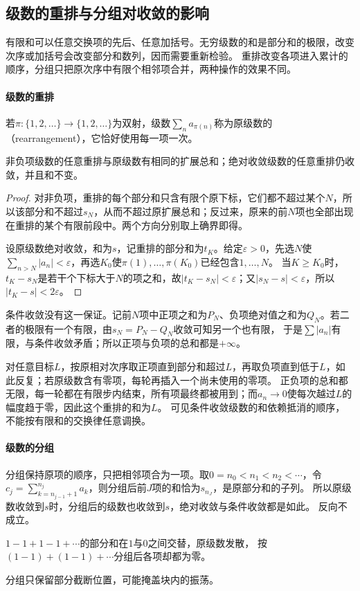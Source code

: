 \subsection{级数的重排与分组对收敛的影响}
\label{sec:ru-series-rearrangement-grouping}
\label{sec:analysis-series-rearrangement-grouping}

有限和可以任意交换项的先后、任意加括号。无穷级数的和是部分和的极限，改变次序或加括号会改变部分和数列，因而需要重新检验。
重排改变各项进入累计的顺序，分组只把原次序中有限个相邻项合并，两种操作的效果不同。

\paragraph{级数的重排}
若$\pi:\{1,2,\ldots\}\to\{1,2,\ldots\}$为双射，级数$\sum_na_{\pi(n)}$称为原级数的（rearrangement），它恰好使用每一项一次。
\begin{theorem}[保持和的重排]
\label{thm:ru-rearrangement}
非负项级数的任意重排与原级数有相同的扩展总和；绝对收敛级数的任意重排仍收敛，并且和不变。
\end{theorem}
\begin{proof}
对非负项，重排的每个部分和只含有限个原下标，它们都不超过某个$N$，所以该部分和不超过$s_N$，从而不超过原扩展总和；反过来，原来的前$N$项也全部出现在重排的某个有限前段中。两个方向分别取上确界即得。

设原级数绝对收敛，和为$s$，记重排的部分和为$t_K$。给定$\varepsilon>0$，先选$N$使$\sum_{n>N}|a_n|<\varepsilon$，再选$K_0$使$\pi(1),\ldots,\pi(K_0)$已经包含$1,\ldots,N$。
当$K\geq K_0$时，$t_K-s_N$是若干个下标大于$N$的项之和，故$|t_K-s_N|<\varepsilon$；又$|s_N-s|<\varepsilon$，所以$|t_K-s|<2\varepsilon$。
\end{proof}

条件收敛没有这一保证。记前$N$项中正项之和为$P_N$、负项绝对值之和为$Q_N$。若二者的极限有一个有限，由$s_N=P_N-Q_N$收敛可知另一个也有限，
于是$\sum|a_n|$有限，与条件收敛矛盾；所以正项与负项的总和都是$+\infty$。

对任意目标$L$，按原相对次序取正项直到部分和超过$L$，再取负项直到低于$L$，如此反复；若原级数含有零项，每轮再插入一个尚未使用的零项。
正负项的总和都无限，每一轮都在有限步内结束，所有项最终都被用到；而$a_n\to0$使每次越过$L$的幅度趋于零，因此这个重排的和为$L$。
可见条件收敛级数的和依赖抵消的顺序，不能按有限和的交换律任意调换。

\paragraph{级数的分组}
分组保持原项的顺序，只把相邻项合为一项。取$0=n_0<n_1<n_2<\cdots$，令$c_j=\sum_{k=n_{j-1}+1}^{n_j}a_k$，则分组后前$J$项的和恰为$s_{n_J}$，是原部分和的子列。
所以原级数收敛到$s$时，分组后的级数也收敛到$s$，绝对收敛与条件收敛都是如此。
反向不成立。
\begin{example}[分组后收敛而原级数发散]
\label{ex:ru-grouping-hides-divergence}
$1-1+1-1+\cdots$的部分和在$1$与$0$之间交替，原级数发散，
按$(1-1)+(1-1)+\cdots$分组后各项却都为零。
\end{example}
分组只保留部分截断位置，可能掩盖块内的振荡。

